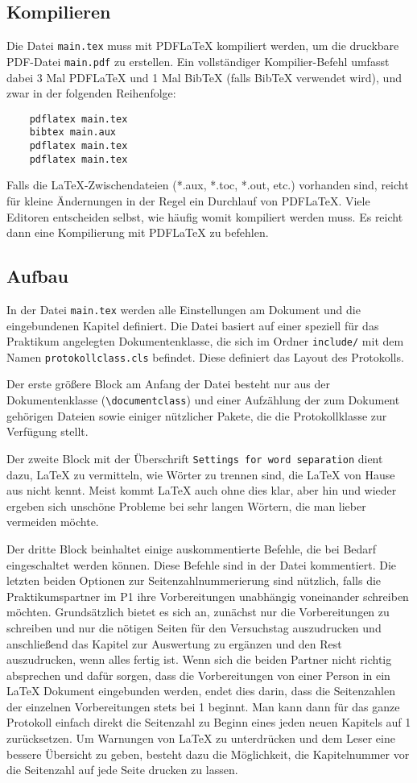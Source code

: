 \subsection{Kompilieren}
Die Datei \verb|main.tex| muss mit PDFLaTeX kompiliert werden, um die druckbare PDF-Datei \verb|main.pdf| zu erstellen. Ein vollständiger Kompilier-Befehl umfasst dabei 3 Mal PDFLaTeX und 1 Mal BibTeX (falls BibTeX verwendet wird), und zwar in der folgenden Reihenfolge:

\begin{verbatim}
	pdflatex main.tex
	bibtex main.aux
	pdflatex main.tex
	pdflatex main.tex
\end{verbatim}

Falls die LaTeX-Zwischendateien (*.aux, *.toc, *.out, etc.) vorhanden sind, reicht für kleine Ändernungen in der Regel ein Durchlauf von PDFLaTeX. Viele Editoren entscheiden selbst, wie häufig womit kompiliert werden muss. Es reicht dann eine Kompilierung mit PDFLaTeX zu befehlen.

\subsection{Aufbau}
In der Datei \verb|main.tex| werden alle Einstellungen am Dokument und die eingebundenen Kapitel definiert. Die Datei basiert auf einer speziell für das Praktikum angelegten Dokumentenklasse, die sich im Ordner \verb|include/| mit dem Namen \verb|protokollclass.cls| befindet. Diese definiert das Layout des Protokolls.

Der erste größere Block am Anfang der Datei besteht nur aus der Dokumentenklasse (\verb|\documentclass|) und einer Aufzählung der zum Dokument gehörigen Dateien sowie einiger nützlicher Pakete, die die Protokollklasse zur Verfügung stellt.

Der zweite Block mit der Überschrift \verb|Settings for word separation| dient dazu, LaTeX zu vermitteln, wie Wörter zu trennen sind, die LaTeX von Hause aus nicht kennt. Meist kommt LaTeX auch ohne dies klar, aber hin und wieder ergeben sich unschöne Probleme bei sehr langen Wörtern, die man lieber vermeiden möchte.

Der dritte Block beinhaltet einige auskommentierte Befehle, die bei Bedarf eingeschaltet werden können. Diese Befehle sind in der Datei kommentiert. Die letzten beiden Optionen zur Seitenzahlnummerierung sind nützlich, falls die Praktikumspartner im P1 ihre Vorbereitungen unabhängig voneinander schreiben möchten. Grundsätzlich bietet es sich an, zunächst nur die Vorbereitungen zu schreiben und nur die nötigen Seiten für den Versuchstag auszudrucken und anschließend das Kapitel zur Auswertung zu ergänzen und den Rest auszudrucken, wenn alles fertig ist. Wenn sich die beiden Partner nicht richtig absprechen und dafür sorgen, dass die Vorbereitungen von einer Person in ein LaTeX Dokument eingebunden werden, endet dies darin, dass die Seitenzahlen der einzelnen Vorbereitungen stets bei 1 beginnt. Man kann dann für das ganze Protokoll einfach direkt die Seitenzahl zu Beginn eines jeden neuen Kapitels auf 1 zurücksetzen. Um Warnungen von LaTeX zu unterdrücken und dem Leser eine bessere Übersicht zu geben, besteht dazu die Möglichkeit, die Kapitelnummer vor die Seitenzahl auf jede Seite drucken zu lassen.

